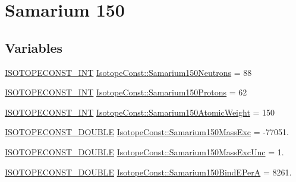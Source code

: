 \hypertarget{group___isotope_const-_samarium-_sm150}{}\section{Samarium 150}
\label{group___isotope_const-_samarium-_sm150}
\subsection*{Variables}
\begin{DoxyCompactItemize}
\item 
\mbox{\hyperlink{group___isotope_const-_macros_ga5f18360b3e99483a35c32d789e62621c}{I\+S\+O\+T\+O\+P\+E\+C\+O\+N\+S\+T\+\_\+\+I\+NT}} \mbox{\hyperlink{group___isotope_const-_samarium-_sm150_ga27a3d73e82862a8b7be2c887838cef5e}{Isotope\+Const\+::\+Samarium150\+Neutrons}} = 88
\item 
\mbox{\hyperlink{group___isotope_const-_macros_ga5f18360b3e99483a35c32d789e62621c}{I\+S\+O\+T\+O\+P\+E\+C\+O\+N\+S\+T\+\_\+\+I\+NT}} \mbox{\hyperlink{group___isotope_const-_samarium-_sm150_ga38f18778f2eb90c272d16d9ea8f40605}{Isotope\+Const\+::\+Samarium150\+Protons}} = 62
\item 
\mbox{\hyperlink{group___isotope_const-_macros_ga5f18360b3e99483a35c32d789e62621c}{I\+S\+O\+T\+O\+P\+E\+C\+O\+N\+S\+T\+\_\+\+I\+NT}} \mbox{\hyperlink{group___isotope_const-_samarium-_sm150_ga6a29ae54098bed79cd80885899a5f284}{Isotope\+Const\+::\+Samarium150\+Atomic\+Weight}} = 150
\item 
\mbox{\hyperlink{group___isotope_const-_macros_ga8f45a7272ce02c0b4c65c44636ed719a}{I\+S\+O\+T\+O\+P\+E\+C\+O\+N\+S\+T\+\_\+\+D\+O\+U\+B\+LE}} \mbox{\hyperlink{group___isotope_const-_samarium-_sm150_ga59836e60f4badb09ab5e5867d63c3cca}{Isotope\+Const\+::\+Samarium150\+Mass\+Exc}} = -\/77051.
\item 
\mbox{\hyperlink{group___isotope_const-_macros_ga8f45a7272ce02c0b4c65c44636ed719a}{I\+S\+O\+T\+O\+P\+E\+C\+O\+N\+S\+T\+\_\+\+D\+O\+U\+B\+LE}} \mbox{\hyperlink{group___isotope_const-_samarium-_sm150_ga15b6a7ed12fabb5abc553790138792c6}{Isotope\+Const\+::\+Samarium150\+Mass\+Exc\+Unc}} = 1.
\item 
\mbox{\hyperlink{group___isotope_const-_macros_ga8f45a7272ce02c0b4c65c44636ed719a}{I\+S\+O\+T\+O\+P\+E\+C\+O\+N\+S\+T\+\_\+\+D\+O\+U\+B\+LE}} \mbox{\hyperlink{group___isotope_const-_samarium-_sm150_gaef3a0e0c1876f2f5ffff2baab481cad2}{Isotope\+Const\+::\+Samarium150\+Bind\+E\+PerA}} = 8261.
\item 

\end{DoxyCompactItemize}
